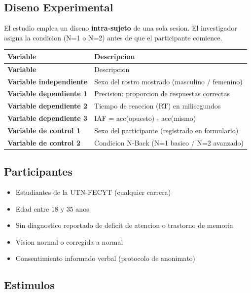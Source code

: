 \documentclass[12pt,a4paper]{article}
\begin{document}
\subsection{Diseno Experimental}

El estudio emplea un diseno \textbf{intra-sujeto} de una sola sesion. El investigador
asigna la condicion (N=1 o N=2) antes de que el participante comience.

\begin{longtable}{>{\bfseries}p{4.5cm} p{8.5cm}}
\toprule
Variable & Descripcion \\
\midrule
\endfirsthead
\toprule
Variable & Descripcion \\
\midrule
\endhead
\bottomrule
\endfoot
Variable independiente  & Sexo del rostro mostrado (masculino / femenino) \\
Variable dependiente 1  & Precision: proporcion de respuestas correctas \\
Variable dependiente 2  & Tiempo de reaccion (RT) en milisegundos \\
Variable dependiente 3  & IAF = acc(opuesto) - acc(mismo) \\
Variable de control 1   & Sexo del participante (registrado en formulario) \\
Variable de control 2   & Condicion N-Back (N=1 basico / N=2 avanzado) \\
\end{longtable}

\subsection{Participantes}

\begin{tcolorbox}[infobox, title={Criterios de inclusion}]
\begin{itemize}[leftmargin=1em]
  \item Estudiantes de la UTN-FECYT (cualquier carrera)
  \item Edad entre 18 y 35 anos
  \item Sin diagnostico reportado de deficit de atencion o trastorno de memoria
  \item Vision normal o corregida a normal
  \item Consentimiento informado verbal (protocolo de anonimato)
\end{itemize}
\end{tcolorbox}

\subsection{Estimulos}
\end{document}
